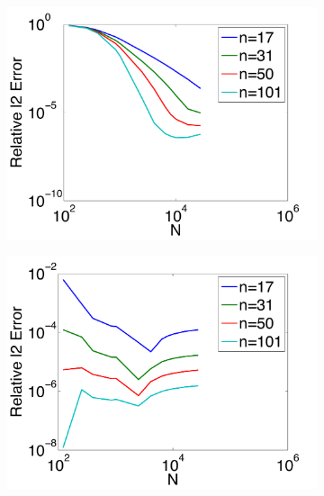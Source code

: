 \begin{figure}[htbp]
	\centering
	\begin{subfigure}[b]{0.425\textwidth}
	\includegraphics[width=1.0\textwidth]{figures/chapter2/compare_weight_generation/lsfc_vs_px_grad_dot_px_grad/direct_rel_l2_error.pdf}
		\end{subfigure}
	\begin{subfigure}[b]{0.425\textwidth}
\includegraphics[width=1.0\textwidth]{figures/chapter2/compare_weight_generation/xsfc_vs_xsfc_alt_on_sph32/direct_rel_l2_error.pdf}
	\end{subfigure}
	\begin{subfigure}[b]{0.425\textwidth}

\end{subfigure}
\end{figure}
